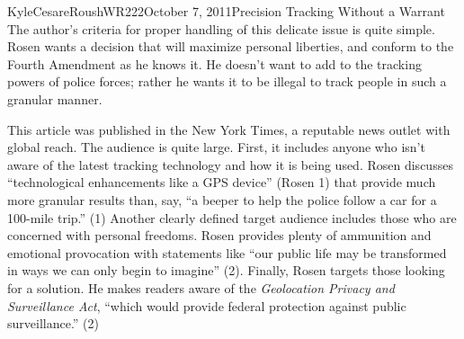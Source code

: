 \documentclass[12pt,letterpaper]{article}
\begin{document}
\begin{mla}{Kyle}{Cesare}{Roush}{WR222}{October 7, 2011}{Precision Tracking
Without a Warrant}
The author's criteria for proper handling of this delicate issue is quite
simple.  Rosen wants a decision that will maximize personal liberties, and
conform to the Fourth Amendment as he knows it.  He doesn't want to add to the
tracking powers of police forces; rather he wants it to be illegal to track
people in such a granular manner.

This article was published in the New York Times, a reputable news outlet with
global reach.  The audience is quite large.  First, it includes anyone who isn't
aware of the latest tracking technology and how it is being used.  Rosen
discusses ``technological enhancements like a GPS device'' (Rosen 1) that
provide much more granular results than, say, ``a beeper to help the police
follow a car for a 100-mile trip.'' (1)  Another clearly defined target audience
includes those who are concerned with personal freedoms.  Rosen provides plenty
of ammunition and emotional provocation with statements like ``our public life
may be transformed in ways we can only begin to imagine'' (2).  Finally, Rosen
targets those looking for a solution.  He makes readers aware of the
\emph{Geolocation Privacy and Surveillance Act}, ``which would provide federal
protection against public surveillance.'' (2)


\end{mla}
\end{document}
